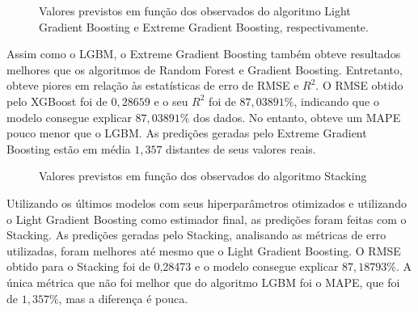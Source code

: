 \documentclass[
  12pt,
  a4paper,
]{scrreprt}
\begin{document}
\begin{figure}
\begin{minipage}{0.50\linewidth}
{}

\subcaption{\label{fig-preds_xgb}}

\end{minipage}%

\caption{\label{fig-preds2}Valores previstos em função dos observados do
algoritmo Light Gradient Boosting e Extreme Gradient Boosting,
respectivamente.}

\end{figure}%

Assim como o LGBM, o Extreme Gradient Boosting também obteve resultados
melhores que os algoritmos de Random Forest e Gradient Boosting.
Entretanto, obteve piores em relação às estatísticas de erro de RMSE e
\(R^2\). O RMSE obtido pelo XGBoost foi de \(0,28659\) e o seu \(R^2\)
foi de \(87,03891\%\), indicando que o modelo consegue explicar
\(87,03891\%\) dos dados. No entanto, obteve um MAPE pouco menor que o
LGBM. As predições geradas pelo Extreme Gradient Boosting estão em média
\(1,357%
\) distantes de seus valores reais.

\begin{figure}


\caption{\label{fig-preds_stacking}Valores previstos em função dos
observados do algoritmo Stacking}

\end{figure}%

\vspace{12pt}

Utilizando os últimos modelos com seus hiperparâmetros otimizados e
utilizando o Light Gradient Boosting como estimador final, as predições
foram feitas com o Stacking. As predições geradas pelo Stacking,
analisando as métricas de erro utilizadas, foram melhores até mesmo que
o Light Gradient Boosting. O RMSE obtido para o Stacking foi de 0,28473
e o modelo consegue explicar \(87,18793\%\). A única métrica que não foi
melhor que do algoritmo LGBM foi o MAPE, que foi de \(1,357\%\), mas a
diferença é pouca.
\end{document}
